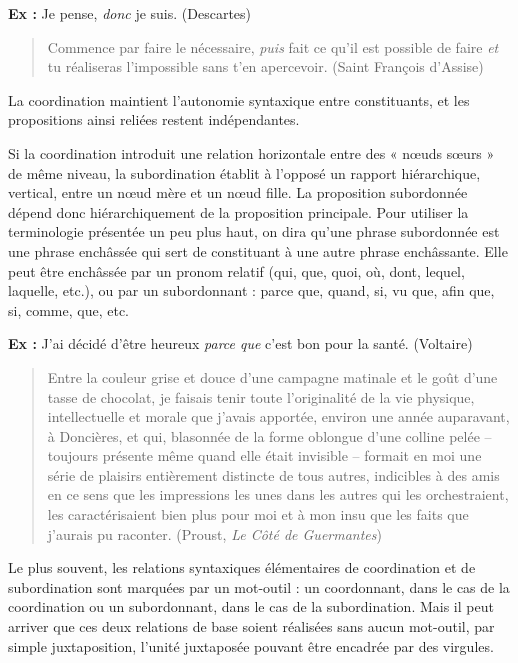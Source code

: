 \noindent\textbf{Ex :} Je pense, \textit{donc} je suis. (Descartes)
\begin{quote}
Commence par faire le nécessaire, \textit{puis} fait ce qu’il est possible de faire \textit{et} tu réaliseras l’impossible sans t’en apercevoir. (Saint François d’Assise)
\end{quote}
La coordination maintient l’autonomie syntaxique entre constituants, et les propositions ainsi reliées restent indépendantes.

Si la coordination introduit une relation horizontale entre des « nœuds sœurs » de même niveau, la subordination établit à l’opposé un rapport hiérarchique, vertical, entre un nœud mère et un nœud fille. La proposition subordonnée dépend donc hiérarchiquement de la proposition principale. Pour utiliser la terminologie présentée un peu plus haut, on dira qu’une phrase subordonnée est une phrase enchâssée qui sert de constituant à une autre phrase enchâssante. Elle peut être enchâssée par un pronom relatif (qui, que, quoi, où, dont, lequel, laquelle, etc.), ou par un subordonnant : parce que, quand, si, vu que, afin que, si, comme, que, etc.

\noindent\textbf{Ex :} J’ai décidé d’être heureux \textit{parce que} c’est bon pour la santé. (Voltaire)
\begin{quote}
Entre la couleur grise et douce d’une campagne matinale et le goût d’une tasse de chocolat, je faisais tenir toute l’originalité de la vie physique, intellectuelle et morale que j’avais apportée, environ une année auparavant, à Doncières, et qui, blasonnée de la forme oblongue d’une colline pelée – toujours présente même quand elle était invisible – formait en moi une série de plaisirs entièrement distincte de tous autres, indicibles à des amis en ce sens que les impressions les unes dans les autres qui les orchestraient, les caractérisaient bien plus pour moi et à mon insu que les faits que j’aurais pu raconter. (Proust, \textit{Le Côté de Guermantes})
\end{quote}

Le plus souvent, les relations syntaxiques élémentaires de coordination et de subordination sont marquées par un mot-outil : un coordonnant, dans le cas de la coordination ou un subordonnant, dans le cas de la subordination. Mais il peut arriver que ces deux relations de base soient réalisées sans aucun mot-outil, par simple juxtaposition, l’unité juxtaposée pouvant être encadrée par des virgules.

